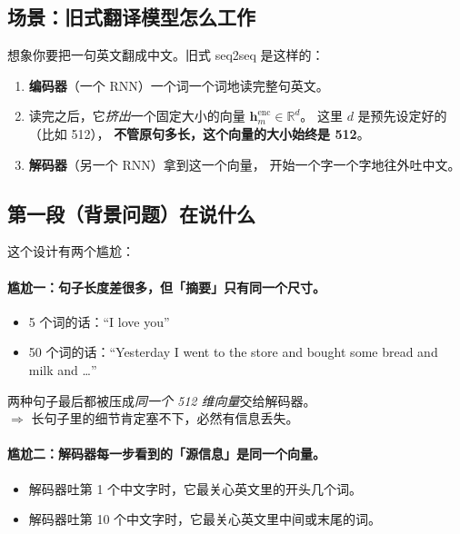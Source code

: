 \documentclass[11pt,a4paper]{ctexart}
\newcommand{\vect}[1]{\boldsymbol{#1}}
\newcommand{\R}{\mathbb{R}}
\begin{document}
\subsection{场景：旧式翻译模型怎么工作}

想象你要把一句英文翻成中文。旧式 seq2seq 是这样的：

\begin{enumerate}
  \item \textbf{编码器}（一个 RNN）一个词一个词地读完整句英文。
  \item 读完之后，它\emph{挤出}一个固定大小的向量
        $\vect{h}^{\text{enc}}_m \in \R^d$。
        这里 $d$ 是预先设定好的（比如 512），
        \textbf{不管原句多长，这个向量的大小始终是 512}。
  \item \textbf{解码器}（另一个 RNN）拿到这一个向量，
        开始一个字一个字地往外吐中文。
\end{enumerate}

\subsection{第一段（背景问题）在说什么}

这个设计有两个尴尬：

\paragraph{尴尬一：句子长度差很多，但「摘要」只有同一个尺寸。}

\begin{itemize}
  \item 5 个词的话：``I love you''
  \item 50 个词的话：``Yesterday I went to the store and bought some bread and milk and \dots''
\end{itemize}

两种句子最后都被压成\emph{同一个 512 维向量}交给解码器。\\
$\Rightarrow$ 长句子里的细节肯定塞不下，必然有信息丢失。

\paragraph{尴尬二：解码器每一步看到的「源信息」是同一个向量。}

\begin{itemize}
  \item 解码器吐第 1 个中文字时，它最关心英文里的开头几个词。
  \item 解码器吐第 10 个中文字时，它最关心英文里中间或末尾的词。
\end{itemize}
\end{document}
